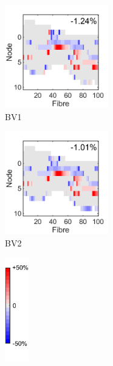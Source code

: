 \begin{figure}
    \vspace{1em}%
    \begin{subfigure}[t]{0.3\textwidth}
    	\phantom{\hspace{4.73cm}}
    \end{subfigure}%
    \begin{subfigure}[t]{0.3\textwidth}
        \centering
        \includegraphics[height=4.5cm]{Simulations/Vasculature/delta_AF-BV-mainBV}
        \caption{BV1}
        \label{fig:vasc_af_delta_mainBV}
    \end{subfigure}%
    \begin{subfigure}[t]{0.3\textwidth}
        \centering
        \includegraphics[height=4.5cm]{Simulations/Vasculature/delta_AF-BV-allBV}
        \caption{BV2}
        \label{fig:vasc_af_delta_allBV}
    \end{subfigure}%
    \phantom{\hspace{3.42mm}}%
    \begin{subfigure}[t]{0.09\textwidth}
        \centering
        \includegraphics[height=4.5cm]{Simulations/Vasculature/cbar_af_delta}
        \label{fig:vasc_af_delta_cbar}
    \end{subfigure}%
    

\end{figure}
